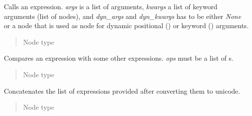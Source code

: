 \documentclass[a4paper,10pt,english]{sphinxmanual}
\begin{document}
\begin{fulllineitems}
\label{extensions:jinja2.nodes.Call}
Calls an expression.  \emph{args} is a list of arguments, \emph{kwargs} a list
of keyword arguments (list of {\hyperref[extensions:jinja2.nodes.Keyword]{}} nodes), and \emph{dyn\_args}
and \emph{dyn\_kwargs} has to be either \emph{None} or a node that is used as
node for dynamic positional () or keyword ()
arguments.
\begin{quote}\begin{description}
\item[{Node type}] \leavevmode
{\hyperref[extensions:jinja2.nodes.Expr]{}}

\end{description}\end{quote}

\end{fulllineitems}


\begin{fulllineitems}
\label{extensions:jinja2.nodes.Compare}
Compares an expression with some other expressions.  \emph{ops} must be a
list of {\hyperref[extensions:jinja2.nodes.Operand]{}}s.
\begin{quote}\begin{description}
\item[{Node type}] \leavevmode
{\hyperref[extensions:jinja2.nodes.Expr]{}}

\end{description}\end{quote}

\end{fulllineitems}


\begin{fulllineitems}
\label{extensions:jinja2.nodes.Concat}
Concatenates the list of expressions provided after converting them to
unicode.
\begin{quote}\begin{description}
\item[{Node type}] \leavevmode
{\hyperref[extensions:jinja2.nodes.Expr]{}}

\end{description}\end{quote}

\end{fulllineitems}
\end{document}
